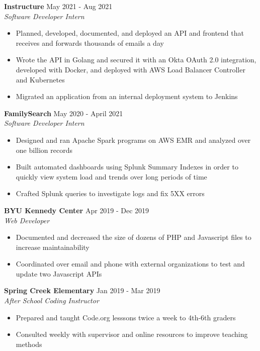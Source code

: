\documentclass[letterpaper]{article}
\begin{document}
\textbf{Instructure} \hfill May 2021 - Aug 2021\\
\textit{Software Developer Intern}\\
\vspace{-1mm}
\begin{itemize} \itemsep 1pt
	\item Planned, developed, documented, and deployed an API and frontend that receives and forwards thousands of emails a day
	\item Wrote the API in Golang and secured it with an Okta OAuth 2.0 integration, developed with Docker, and deployed with AWS Load Balancer Controller and Kubernetes
	\item Migrated an application from an internal deployment system to Jenkins
\end{itemize}
\textbf{FamilySearch} \hfill May 2020 - April 2021\\
\textit{Software Developer Intern}\\
\vspace{-1mm}
\begin{itemize} \itemsep 1pt
	\item Designed and ran Apache Spark programs on AWS EMR and analyzed over one billion records
	\item Built automated dashboards using Splunk Summary Indexes in order to quickly view system load and trends over long periods of time
	\item Crafted Splunk queries to investigate logs and fix 5XX errors
    
\end{itemize}
\textbf{BYU Kennedy Center} \hfill Apr 2019 - Dec 2019\\
\textit{Web Developer}\\
\vspace{-1mm}
\begin{itemize} \itemsep 1pt
	\item Documented and decreased the size of dozens of PHP and Javascript files to increase maintainability
	\item Coordinated over email and phone with external organizations to test and update two Javascript APIs
\end{itemize}
\textbf{Spring Creek Elementary} \hfill Jan 2019 - Mar 2019\\
\textit{After School Coding Instructor}\\
\vspace{-1mm}
\begin{itemize} \itemsep 1pt
	\item Prepared and taught Code.org lesssons twice a week to 4th-6th graders
	\item Consulted weekly with supervisor and online resources to improve teaching methods
\end{itemize}
\end{document}
